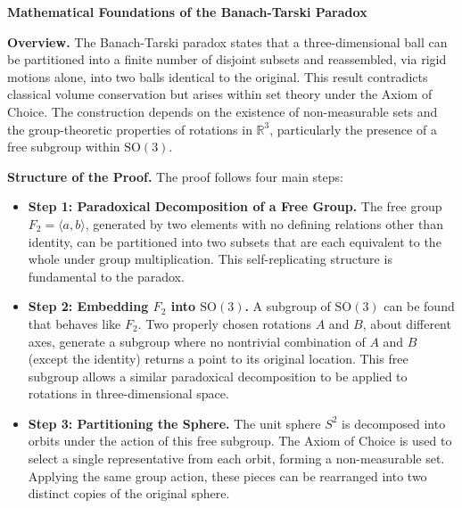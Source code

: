 \begin{technical}
{\Large\textbf{Mathematical Foundations of the Banach-Tarski Paradox}}

\textbf{Overview.}  
The Banach-Tarski paradox states that a three-dimensional ball can be partitioned into a finite number of disjoint subsets and reassembled, via rigid motions alone, into two balls identical to the original. This result contradicts classical volume conservation but arises within set theory under the Axiom of Choice. The construction depends on the existence of non-measurable sets and the group-theoretic properties of rotations in \(\mathbb{R}^3\), particularly the presence of a free subgroup within \(\mathrm{SO}(3)\).

\textbf{Structure of the Proof.}  
The proof follows four main steps:
\begin{itemize}[leftmargin=*]
    \item \textbf{Step 1: Paradoxical Decomposition of a Free Group.}  
    The free group \( F_2 = \langle a, b \rangle \), generated by two elements with no defining relations other than identity, can be partitioned into two subsets that are each equivalent to the whole under group multiplication. This self-replicating structure is fundamental to the paradox.
    
    \item \textbf{Step 2: Embedding \( F_2 \) into \(\mathrm{SO}(3)\).}  
    A subgroup of \(\mathrm{SO}(3)\) can be found that behaves like \( F_2 \). Two properly chosen rotations \( A \) and \( B \), about different axes, generate a subgroup where no nontrivial combination of \( A \) and \( B \) (except the identity) returns a point to its original location. This free subgroup allows a similar paradoxical decomposition to be applied to rotations in three-dimensional space.

    \item \textbf{Step 3: Partitioning the Sphere.}  
    The unit sphere \( S^2 \) is decomposed into orbits under the action of this free subgroup. The Axiom of Choice is used to select a single representative from each orbit, forming a non-measurable set. Applying the same group action, these pieces can be rearranged into two distinct copies of the original sphere.


\end{itemize}
\end{technical}
